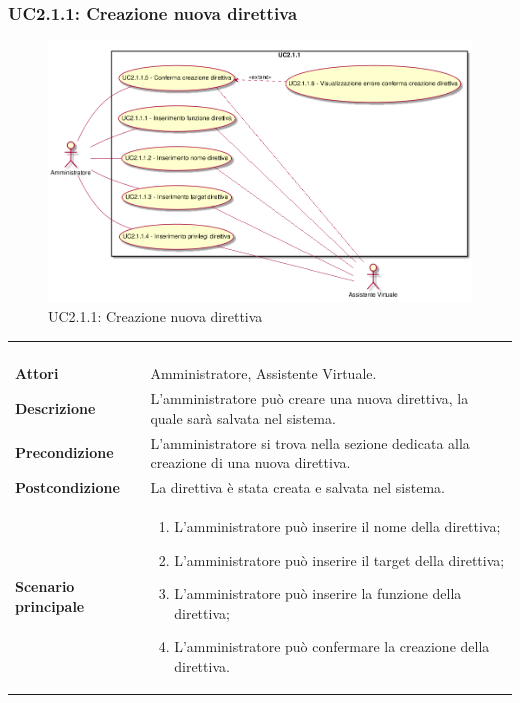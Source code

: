 \newpage\subsubsection{UC2.1.1: Creazione nuova direttiva}
\label{UC2.1.1}
\begin{figure}[h]
\centering
\includegraphics[width=\textwidth,height=\textheight,keepaspectratio]{images/UseCaseUC211.png}
\caption{UC2.1.1: Creazione nuova direttiva}
\end{figure}
\begin{longtable}{l|p{10cm}}
\rowcolor[gray]{0.8} \multicolumn{2}{c}{} \\
\rowcolor[gray]{0.8} \multicolumn{2}{c}{\textbf{UC2.1.1 - Creazione nuova direttiva}} \\
\rowcolor[gray]{0.8} \multicolumn{2}{c}{} \\
\hline
&\\
\textbf{Attori} & Amministratore, Assistente Virtuale.\\[7pt]
\textbf{Descrizione} & L'amministratore può creare una nuova direttiva, la quale sarà salvata nel sistema.\\[7pt]
\textbf{Precondizione} & L'amministratore si trova nella sezione dedicata alla creazione di una nuova direttiva.\\[7pt]
\textbf{Postcondizione} & La direttiva è stata creata e salvata nel sistema.\\[7pt]
\textbf{Scenario principale} &\begin{enumerate}
\item  L'amministratore può inserire il nome della direttiva;
\item  L'amministratore può inserire il target della direttiva;
\item  L'amministratore può inserire la funzione della direttiva;
\item  L'amministratore può confermare la creazione della direttiva. 
\end{enumerate}
\\[7pt]\hline
\end{longtable}


